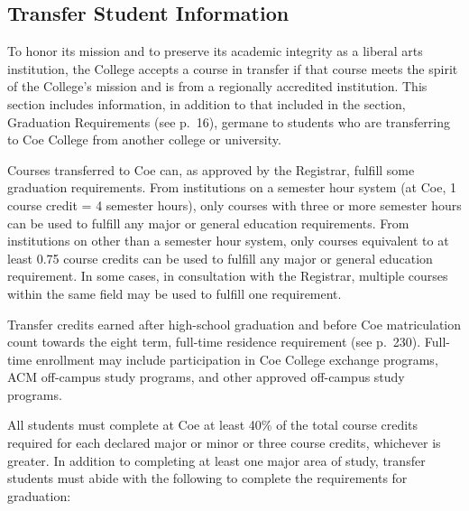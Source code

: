 \documentclass[
  letterpaper,
]{scrbook}
\begin{document}
\hypertarget{transfer-student-information}{%
\subsection*{Transfer Student
Information}\label{transfer-student-information}}

To honor its mission and to preserve its academic integrity as a liberal
arts institution, the College accepts a course in transfer if that
course meets the spirit of the College's mission and is from a
regionally accredited institution. This section includes information, in
addition to that included in the section, Graduation Requirements (see
p.~16), germane to students who are transferring to Coe College from
another college or university.

Courses transferred to Coe can, as approved by the Registrar, fulfill
some graduation requirements. From institutions on a semester hour
system (at Coe, 1 course credit = 4 semester hours), only courses with
three or more semester hours can be used to fulfill any major or general
education requirements. From institutions on other than a semester hour
system, only courses equivalent to at least 0.75 course credits can be
used to fulfill any major or general education requirement. In some
cases, in consultation with the Registrar, multiple courses within the
same field may be used to fulfill one requirement.

Transfer credits earned after high-school graduation and before Coe
matriculation count towards the eight term, full-time residence
requirement (see p.~230). Full-time enrollment may include participation
in Coe College exchange programs, ACM off-campus study programs, and
other approved off-campus study programs.

All students must complete at Coe at least 40\% of the total course
credits required for each declared major or minor or three course
credits, whichever is greater. In addition to completing at least one
major area of study, transfer students must abide with the following to
complete the requirements for graduation:
\end{document}
